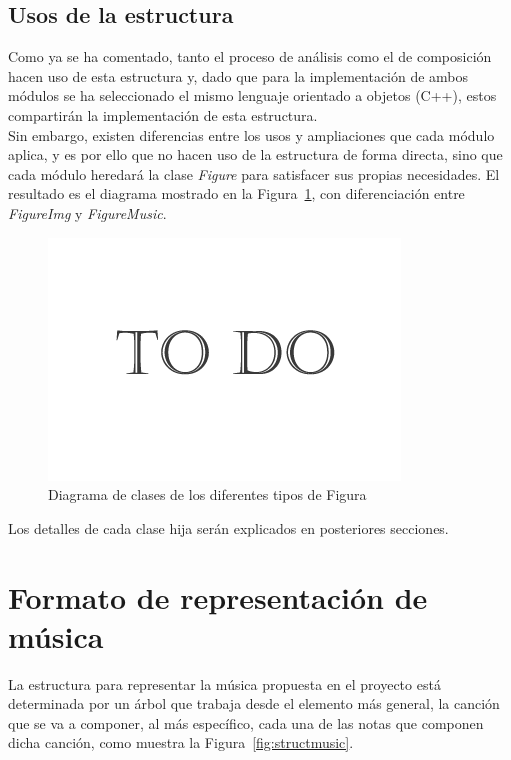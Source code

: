 			
\subsection{Usos de la estructura}	

	Como ya se ha comentado, tanto el proceso de análisis como el de composición hacen uso de esta estructura y, dado que para la implementación de ambos módulos se ha seleccionado el mismo lenguaje orientado a objetos (C++), estos compartirán la implementación de esta estructura.\\
	
	Sin embargo, existen diferencias entre los usos y ampliaciones que cada módulo aplica, y es por ello que no hacen uso de la estructura de forma directa,  sino que cada módulo heredará la clase \emph{Figure} para satisfacer sus propias necesidades. El resultado es el diagrama mostrado en la Figura~\ref{fig:diagramaFigMupPhic}, con diferenciación entre \emph{FigureImg} y \emph{FigureMusic}.\\

		\begin{figure}[htbp]
		\centering
		\includegraphics[scale=0.47]{graphics/todo.png}
		\caption{Diagrama de clases de los diferentes tipos de Figura}
		\label{fig:diagramaFigMupPhic}
		\end{figure}
		
	Los detalles de cada clase hija serán explicados en posteriores secciones.	


\section{Formato de representación de música}


La estructura para representar la música propuesta en el proyecto está determinada por un árbol que trabaja desde el elemento más general, la canción que se va a componer, al más específico, cada una de las notas que componen dicha canción, como muestra la Figura~\ref{fig:structmusic}.\\
	
